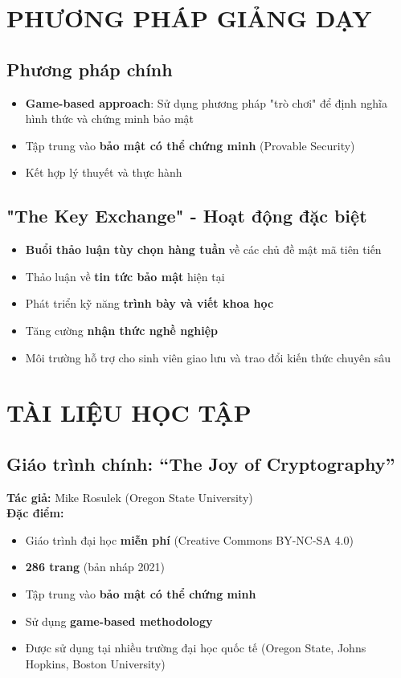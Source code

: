 \section{PHƯƠNG PHÁP GIẢNG DẠY}

\subsection{Phương pháp chính}
\begin{itemize}
\item \textbf{Game-based approach}: Sử dụng phương pháp "trò chơi" để định nghĩa hình thức và chứng minh bảo mật
\item Tập trung vào \textbf{bảo mật có thể chứng minh} (Provable Security)
\item Kết hợp lý thuyết và thực hành
\end{itemize}

\subsection{"The Key Exchange" - Hoạt động đặc biệt}
\begin{itemize}
\item \textbf{Buổi thảo luận tùy chọn hàng tuần} về các chủ đề mật mã tiên tiến
\item Thảo luận về \textbf{tin tức bảo mật} hiện tại
\item Phát triển kỹ năng \textbf{trình bày và viết khoa học}
\item Tăng cường \textbf{nhận thức nghề nghiệp}
\item Môi trường hỗ trợ cho sinh viên giao lưu và trao đổi kiến thức chuyên sâu
\end{itemize}

\section{TÀI LIỆU HỌC TẬP}

\subsection{Giáo trình chính: ``The Joy of Cryptography''}
\textbf{Tác giả:} Mike Rosulek (Oregon State University)\\
\textbf{Đặc điểm:}
\begin{itemize}
\item Giáo trình đại học \textbf{miễn phí} (Creative Commons BY-NC-SA 4.0)
\item \textbf{286 trang} (bản nháp 2021)
\item Tập trung vào \textbf{bảo mật có thể chứng minh}
\item Sử dụng \textbf{game-based methodology}
\item Được sử dụng tại nhiều trường đại học quốc tế (Oregon State, Johns Hopkins, Boston University)
\end{itemize}

